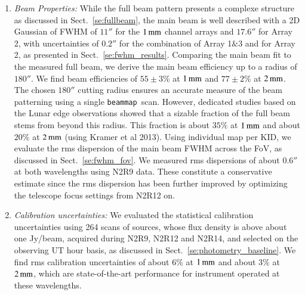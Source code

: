 \documentclass{aa}
\newcommand{\bm}{{\tt beammap}}
\begin{document}
\begin{enumerate}
\item \emph{Beam Properties:} While the full beam pattern presents a complexe structure as discussed
  in Sect.~\ref{se:fullbeam}, the main beam is well described with a 2D
  Gaussian of FWHM of $11''$ for the $1\,\rm{mm}$ channel arrays
  and $17.6''$ for Array 2, with uncertainties of  $0.2''$ for the
  combination of Array 1$\&$3 and for Array 2, as presented in
  Sect.~\ref{se:fwhm_results}.
  Comparing the main beam fit to the measured full beam, we derive the
  main beam efficiency up to a radius of $180''$. We find beam
  efficiencies of $55 \pm 3 \%$ at $1\,\rm{mm}$ and $77 \pm 2 \%$ at
  $2\,\rm{mm}$. %
  The chosen $180''$ cutting radius ensures an accurate
  measure of the beam patterning using a single \bm\ scan. However,
  dedicated studies based on the Lunar edge observations showed that
  a sizable fraction of the full beam stems from beyond this
  radius. This fraction is about $35\%$ at $1\,\rm{mm}$ and about $20\%$
  at $2\,\rm{mm}$ (using Kramer et al 2013). Using individual map per
  KID, we evaluate the rms dispersion of the main beam FWHM across the
  FoV, as discussed in Sect.~\ref{se:fwhm_fov}. We measured rms
  dispersions of about $0.6''$ at both wavelengths using N2R9 data. These
  constitute a conservative estimate since the rms dispersion has been
  further improved by optimizing the telescope focus settings from N2R12
  on.  

\item \emph{Calibration uncertainties:} We evaluated the statistical calibration uncertainties using 264 
  scans of sources, whose flux density is above about one Jy/beam,
  acquired during N2R9, N2R12 and N2R14, and selected on the observing UT hour basis, as discussed in
  Sect.~\ref{se:photometry_baseline}. We find rms calibration
  uncertainties of about $6\%$ at $1\,\rm{mm}$ and about $3\%$ at
  $2\,\rm{mm}$, which are state-of-the-art performance for instrument
  operated at these wavelengths. 
  


\end{enumerate}
\end{document}
